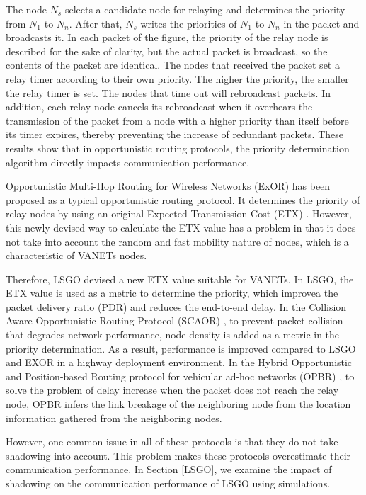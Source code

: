 \documentclass[conference]{IEEEtran}
\begin{document}
The node $N_{s}$ selects a candidate node for relaying and determines the priority from $N_{1}$ to $N_{n}$. After that, $N_{s}$ writes the priorities of $N_{1}$ to $N_{n}$ in the packet and broadcasts it. 
In each packet of the figure, the priority of the relay node is described for the sake of clarity, but the actual packet is broadcast, so the contents of the packet are identical. 
The nodes that received the packet set a relay timer according to their own priority.
The higher the priority, the smaller the relay timer is set.
The nodes that time out will rebroadcast packets.
In addition, each relay node cancels its rebroadcast when it overhears the transmission of the packet from a node with a higher priority than itself
before its timer expires, thereby preventing the increase of redundant packets.
These results show that in opportunistic routing protocols, the priority determination algorithm directly impacts  communication performance.


Opportunistic Multi-Hop Routing for Wireless
Networks (ExOR) \cite{16} has been proposed as a typical opportunistic routing protocol. It determines the priority of relay nodes by using an original Expected Transmission Cost (ETX) \cite{21}. However, this newly devised way to calculate the ETX value has a problem in that it does not take into account the random and fast mobility nature of nodes, which is a characteristic of VANETs nodes.\par


Therefore, LSGO devised a new ETX value suitable for VANETs. In LSGO, the ETX value is used as a metric to determine the priority, which improvea the packet delivery ratio (PDR) and reduces the end-to-end delay.
In the Collision Aware Opportunistic Routing Protocol (SCAOR) \cite{22}, to prevent  packet collision that degrades network performance, node density is added as a metric in the priority determination. 
As a result, performance is improved compared to LSGO and EXOR in a highway deployment environment. 
In the Hybrid Opportunistic and Position-based Routing protocol for vehicular 
ad-hoc networks (OPBR) \cite{23}, to solve the problem of delay increase when the packet does not reach the relay node, OPBR infers the link breakage of the neighboring node from the location information gathered from the neighboring nodes.

However, one  common issue in all of these protocols is that they do not take shadowing into account.
This problem makes these protocols overestimate their communication performance. In Section \ref{LSGO}, we examine the impact of shadowing on the communication performance of LSGO using simulations. 
\end{document}
